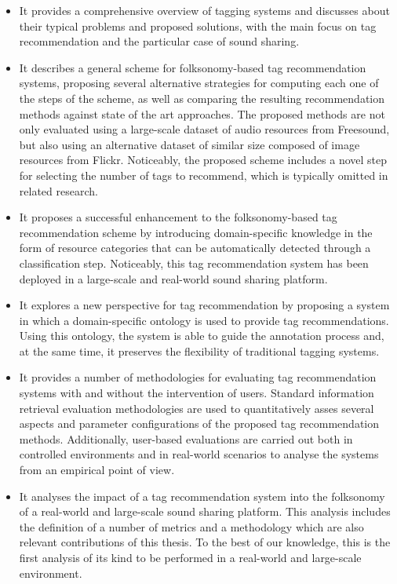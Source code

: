 \begin{itemize}

\item It provides a comprehensive overview of tagging systems and discusses about their typical problems and proposed solutions, with the main focus on tag recommendation and the particular case of sound sharing.

\item It describes a general scheme for folksonomy-based tag recommendation systems, proposing several alternative strategies for computing each one of the steps of the scheme, as well as comparing the resulting recommendation methods against state of the art approaches. The proposed methods are not only evaluated using a large-scale dataset of audio resources from Freesound, but also using an alternative dataset of similar size composed of image resources from Flickr. Noticeably, the proposed scheme includes a novel step for selecting the number of tags to recommend, which is typically omitted in related research.

\item It proposes a successful enhancement to the folksonomy-based tag recommendation scheme by introducing domain-specific knowledge in the form of resource categories that can be automatically detected through a classification step. Noticeably, this tag recommendation system has been deployed in a large-scale and real-world sound sharing platform.

\item It explores a new perspective for tag recommendation by proposing a system in which a domain-specific ontology is used to provide tag recommendations. Using this ontology, the system is able to guide the annotation process and, at the same time, it preserves the flexibility of traditional tagging systems.

\item It provides a number of methodologies for evaluating tag recommendation systems with and without the intervention of users. Standard information retrieval evaluation methodologies are used to quantitatively asses several aspects and parameter configurations of the proposed tag recommendation methods. 
Additionally, user-based evaluations are carried out both in controlled environments and in real-world scenarios to analyse the systems from an empirical point of view. 

\item It analyses the impact of a tag recommendation system into the folksonomy of a real-world and large-scale sound sharing platform. This analysis includes the definition of a number of metrics and a methodology which are also relevant contributions of this thesis. 
To the best of our knowledge, this is the first analysis of its kind to be performed in a real-world and large-scale environment.


\end{itemize}

